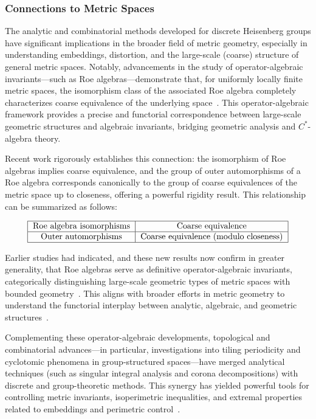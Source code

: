 \documentclass[sigconf]{acmart}
\begin{document}
\subsubsection{Connections to Metric Spaces}

The analytic and combinatorial methods developed for discrete Heisenberg groups have significant implications in the broader field of metric geometry, especially in understanding embeddings, distortion, and the large-scale (coarse) structure of general metric spaces. Notably, advancements in the study of operator-algebraic invariants—such as Roe algebras—demonstrate that, for uniformly locally finite metric spaces, the isomorphism class of the associated Roe algebra completely characterizes coarse equivalence of the underlying space~\cite{ref52}. This operator-algebraic framework provides a precise and functorial correspondence between large-scale geometric structures and algebraic invariants, bridging geometric analysis and $C^*$-algebra theory.

Recent work rigorously establishes this connection: the isomorphism of Roe algebras implies coarse equivalence, and the group of outer automorphisms of a Roe algebra corresponds canonically to the group of coarse equivalences of the metric space up to closeness, offering a powerful rigidity result. This relationship can be summarized as follows:

\[
\begin{tabular}{|c|c|}
\hline
\text{Roe algebra isomorphisms} & \text{Coarse equivalence} \\
\hline
\text{Outer automorphisms} & \text{Coarse equivalence (modulo closeness)} \\
\hline
\end{tabular}
\]

Earlier studies had indicated, and these new results now confirm in greater generality, that Roe algebras serve as definitive operator-algebraic invariants, categorically distinguishing large-scale geometric types of metric spaces with bounded geometry~\cite{ref52}. This aligns with broader efforts in metric geometry to understand the functorial interplay between analytic, algebraic, and geometric structures~\cite{ref51}.

Complementing these operator-algebraic developments, topological and combinatorial advances—in particular, investigations into tiling periodicity and cyclotomic phenomena in group-structured spaces—have merged analytical techniques (such as singular integral analysis and corona decompositions) with discrete and group-theoretic methods. This synergy has yielded powerful tools for controlling metric invariants, isoperimetric inequalities, and extremal properties related to embeddings and perimetric control~\cite{ref108}. 
\end{document}
